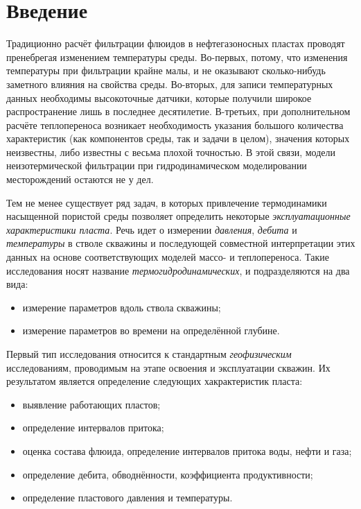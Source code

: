 \section*{Введение}
\setcounter{subsection}{0}
	
	Традиционно расчёт фильтрации флюидов в нефтегазоносных пластах проводят пренебрегая изменением температуры среды. Во-первых, потому, что изменения температуры при фильтрации крайне малы, и не оказывают сколько-нибудь заметного влияния на свойства среды. Во-вторых, для записи температурных данных необходимы высокоточные датчики, которые получили широкое распространение лишь в последнее десятилетие. В-третьих, при дополнительном расчёте теплопереноса возникает необходимость указания большого количества характеристик (как компонентов среды, так и задачи в целом), значения которых неизвестны, либо известны с весьма плохой точностью. В этой связи, модели неизотермической фильтрации при гидродинамическом моделировании месторождений остаются не у дел.

	Тем не менее существует ряд задач, в которых привлечение термодинамики насыщенной пористой среды позволяет определить некоторые \textit{эксплуатационные характеристики пласта}. Речь идет о измерении \textit{давления}, \textit{дебита} и \textit{температуры} в стволе скважины и последующей совместной интерпретации этих данных на основе соответствующих моделей массо- и теплопереноса.
Такие исследования носят название \textit{термогидродинамических}, и подразделяются на два вида:
\begin{itemize}
	\item измерение параметров вдоль ствола скважины;
	\item измерение параметров во времени на определённой глубине.
\end{itemize}
	
	Первый тип исследования относится к стандартным \textit{геофизическим} исследованиям, проводимым на этапе освоения и эксплуатации скважин. Их результатом является определение следующих хакрактеристик пласта:
\begin{itemize}
	\item выявление работающих пластов;
	\item определение интервалов притока;
	\item оценка состава флюида, определение интервалов притока воды, нефти и газа;
	\item определение дебита, обводнённости, коэффициента продуктивности;
	\item определение пластового давления и температуры.
\end{itemize}
	
